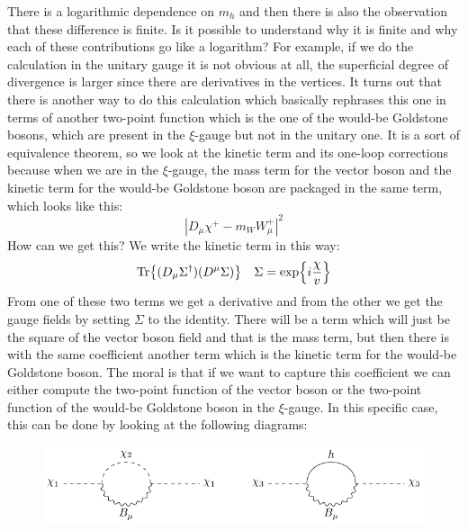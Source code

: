 \documentclass[../main.tex]{subfiles}
\begin{document}
There is a logarithmic dependence on $m_h$ and then there is also the observation that these difference is finite. Is it possible to understand why it is finite and why each of these contributions go like a logarithm? For example, if we do the calculation in the unitary gauge it is not obvious at all, the superficial degree of divergence is larger since there are derivatives in the vertices. It turns out that there is another way to do this calculation which basically rephrases this one in terms of another two-point function which is the one of the would-be Goldstone bosons, which are present in the $\xi$-gauge but not in the unitary one. It is a sort of equivalence theorem, so we look at the kinetic term and its one-loop corrections because when we are in the $\xi$-gauge, the mass term for the vector boson and the kinetic term for the would-be Goldstone boson are packaged in the same term, which looks like this:
\[
|D_\mu\chi^+-m_WW_\mu^+|^2
\]
How can we get this? We write the kinetic term in this way:
\[
\Tr{(D_\mu\Sigma^\dagger)(D^\mu\Sigma)} \quad \Sigma=\exp{i\frac{\chi}{v}}
\]
From one of these two terms we get a derivative and from the other we get the gauge fields by setting $\Sigma$ to the identity. There will be a term which will just be the square of the vector boson field and that is the mass term, but then there is with the same coefficient another term which is the kinetic term for the would-be Goldstone boson. The moral is that if we want to capture this coefficient we can either compute the two-point function of the vector boson or the two-point function of the would-be Goldstone boson in the $\xi$-gauge. In this specific case, this can be done by looking at the following diagrams:
\begin{figure}[h]
    \centering
    \includegraphics{Images/chi.pdf}
    \caption*{}
\end{figure}\\
\end{document}
